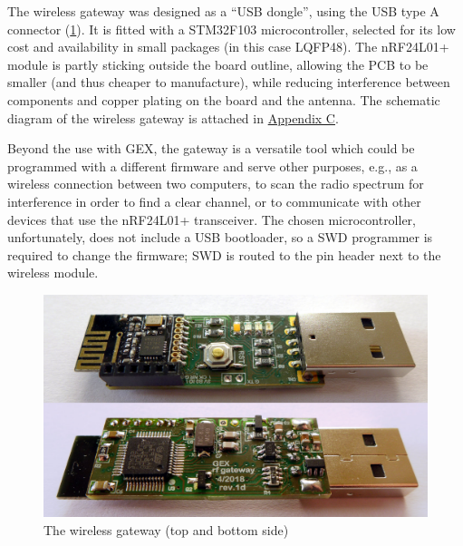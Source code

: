 The wireless gateway was designed as a ``\gls{USB} dongle'', using the \gls{USB} type A connector (\cref{fig:gwxgw}). It is fitted with a STM32F103 microcontroller, selected for its low cost and availability in small packages (in this case LQFP48). The nRF24L01+ module is partly sticking outside the board outline, allowing the \gls{PCB} to be smaller (and thus cheaper to manufacture), while reducing interference between components and copper plating on the board and the antenna. The schematic diagram of the wireless gateway is attached in \hyperref[apx:gex_wgw]{Appendix C}.

Beyond the use with GEX, the gateway is a versatile tool which could be programmed with a different firmware and serve other purposes, e.g., as a wireless connection between two computers, to scan the radio spectrum for interference in order to find a clear channel, or to communicate with other devices that use the nRF24L01+ transceiver. The chosen microcontroller, unfortunately, does not include a USB bootloader, so a SWD programmer is required to change the firmware; SWD is routed to the pin header next to the wireless module.


\begin{figure}[h]
	\centering
	\includegraphics[width=.9\textwidth]{img/photo-rfdongle.jpg}
	\caption{\label{fig:gwxgw}The wireless gateway (top and bottom side)}
\end{figure}

